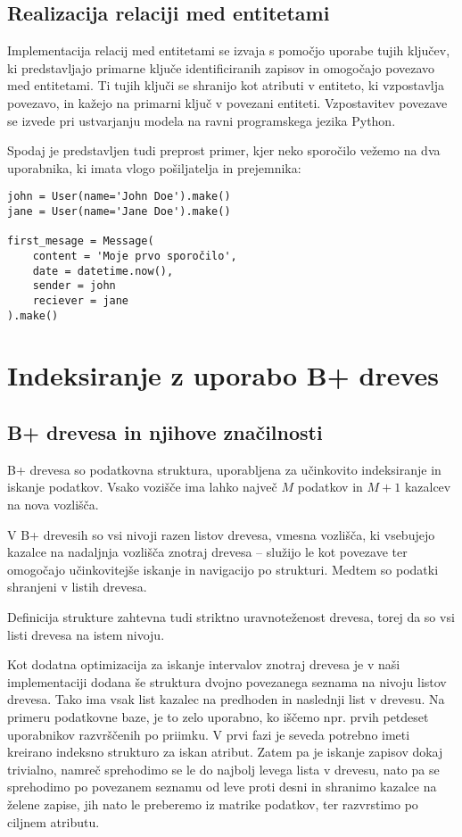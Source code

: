 \documentclass[a4paper,12pt,openright]{book}
\begin{document}
        \subsection{Realizacija relaciji med entitetami}

        Implementacija relacij med entitetami se izvaja s pomočjo uporabe tujih ključev, ki predstavljajo primarne ključe identificiranih zapisov in omogočajo povezavo med entitetami. Ti tujih ključi se shranijo kot atributi v entiteto, ki vzpostavlja povezavo, in kažejo na primarni ključ v povezani entiteti. Vzpostavitev povezave se izvede pri ustvarjanju modela na ravni programskega jezika Python.

        Spodaj je predstavljen tudi preprost primer, kjer neko sporočilo vežemo na dva uporabnika, ki imata vlogo pošiljatelja in prejemnika:
\begin{verbatim}
john = User(name='John Doe').make()
jane = User(name='Jane Doe').make()

first_mesage = Message(
    content = 'Moje prvo sporočilo',
    date = datetime.now(),
    sender = john
    reciever = jane
).make()
\end{verbatim}

    \section{Indeksiranje z uporabo B+ dreves}
        \subsection{B+ drevesa in njihove značilnosti}

        B+ drevesa so podatkovna struktura, uporabljena za učinkovito indeksiranje in iskanje podatkov.
        Vsako vozišče ima lahko največ $M$ podatkov in $M+1$ kazalcev na nova vozlišča.

        V B+ drevesih so vsi nivoji razen listov drevesa, vmesna vozlišča, ki vsebujejo kazalce na nadaljnja vozlišča znotraj drevesa – služijo le kot povezave ter omogočajo učinkovitejše iskanje in navigacijo po strukturi. Medtem so podatki shranjeni v listih drevesa.

        Definicija strukture zahtevna tudi striktno uravnoteženost drevesa, torej da so vsi listi drevesa na istem nivoju.

        Kot dodatna optimizacija za iskanje intervalov znotraj drevesa je v naši implementaciji dodana še struktura dvojno povezanega seznama na nivoju listov drevesa. Tako ima vsak list kazalec na predhoden in naslednji list v drevesu. Na primeru podatkovne baze, je to zelo uporabno, ko iščemo npr. prvih petdeset uporabnikov razvrščenih po priimku. V prvi fazi je seveda potrebno imeti kreirano indeksno strukturo za iskan atribut. Zatem pa je iskanje zapisov dokaj trivialno, namreč sprehodimo se le do najbolj levega lista v drevesu, nato pa se sprehodimo po povezanem seznamu od leve proti desni in shranimo kazalce na želene zapise, jih nato le preberemo iz matrike podatkov, ter razvrstimo po ciljnem atributu.
\end{document}
